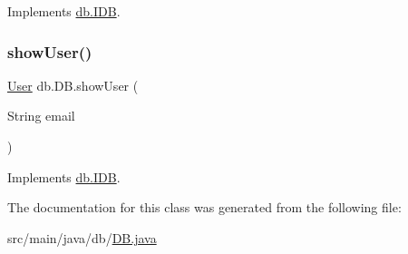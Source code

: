 Implements \hyperlink{interfacedb_1_1_i_d_b_a6c44c3135f07ec6dbef84ecc6fe4f90f}{db.\+I\+DB}.

\mbox{\label{classdb_1_1_d_b_a914986669ac622ef33ae344baaefa32c}} 
\subsubsection{\texorpdfstring{show\+User()}{showUser()}}
{\footnotesize\ttfamily \hyperlink{classserver_1_1data_1_1_user}{User} db.\+D\+B.\+show\+User (\begin{DoxyParamCaption}\item[{String}]{email }\end{DoxyParamCaption})}



Implements \hyperlink{interfacedb_1_1_i_d_b_a8dca82226b1c27ceb4b765259546513d}{db.\+I\+DB}.



The documentation for this class was generated from the following file\+:\begin{DoxyCompactItemize}
\item 
src/main/java/db/\hyperlink{_d_b_8java}{D\+B.\+java}\end{DoxyCompactItemize}
